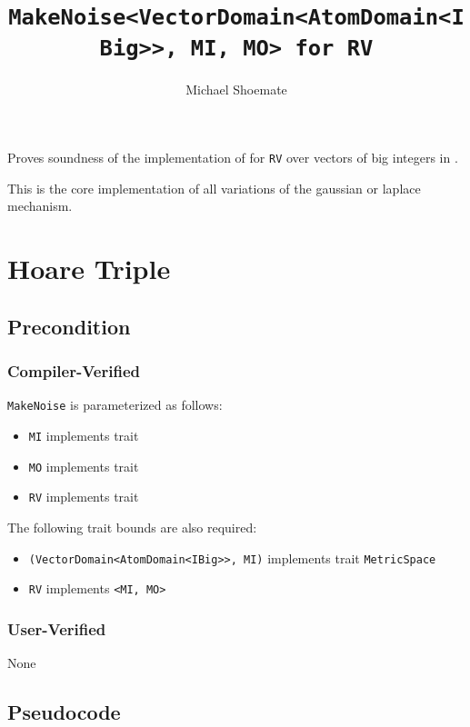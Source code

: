 \documentclass{article}
\title{\texttt{MakeNoise<VectorDomain<AtomDomain<IBig>>, MI, MO> for RV}}
\author{Michael Shoemate}
\date{}
\begin{document}
\maketitle

\contrib
Proves soundness of the implementation of  
for \texttt{RV} over vectors of big integers in .

This is the core implementation of all variations of the gaussian or laplace mechanism.

\section{Hoare Triple}
\subsection*{Precondition}
\subsubsection*{Compiler-Verified}
\texttt{MakeNoise} is parameterized as follows:
\begin{itemize}
    \item \texttt{MI} implements trait 
    \item \texttt{MO} implements trait 
    \item \texttt{RV} implements trait 
\end{itemize}

The following trait bounds are also required:
\begin{itemize}
    \item \texttt{(VectorDomain<AtomDomain<IBig>{}>, MI)} implements trait \texttt{MetricSpace}
    \item \texttt{RV} implements \texttt{<MI, MO>}
\end{itemize}

\subsubsection*{User-Verified}
None

\subsection*{Pseudocode}

\end{document}
